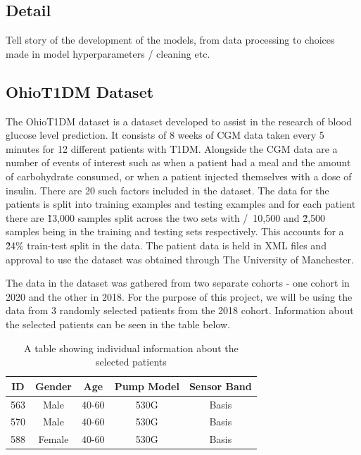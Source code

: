 	\subsection{Detail}
        Tell story of the development of the models, from data processing to choices made in model hyperparameters / cleaning etc.

      \subsection{OhioT1DM Dataset}
      The OhioT1DM \cite{ohio} dataset is a dataset developed to assist in the research of blood glucose level prediction. It consists of 8 weeks of CGM data taken every 5 minutes for 12 different patients with T1DM. Alongside the CGM data are a number of events of interest such as when a patient had a meal and the amount of carbohydrate consumed, or when a patient injected themselves with a dose of insulin. There are 20 such factors included in the dataset. The data for the patients is split into training examples and testing examples and for each patient there are \~13,000 samples split across the two sets with /~10,500 and \~2,500 samples being in the training and testing sets respectively. This accounts for a \~24\% train-test split in the data. The patient data is held in XML files and approval to use the dataset was obtained through The University of Manchester.

      The data in the dataset was gathered from two separate cohorts - one cohort in 2020 and the other in 2018. For the purpose of this project, we will be using the data from 3 randomly selected patients from the 2018 cohort. Information about the selected patients can be seen in the table below.


      \begin{table}[H]
        \begin{center}
          \caption{A table showing individual information about the selected patients}
          \begin{tabular}{||c c c c c||} 
          \hline
          ID & Gender & Age & Pump Model & Sensor Band \\ [0.5ex] 
          \hline\hline
          563 & Male & 40-60 & 530G & Basis \\ 
          \hline
          570 & Male & 40-60 & 530G & Basis \\
          \hline
          588 & Female & 40-60 & 530G & Basis \\ [1ex]
          \hline 
          \end{tabular}
        \end{center}
      \end{table}

